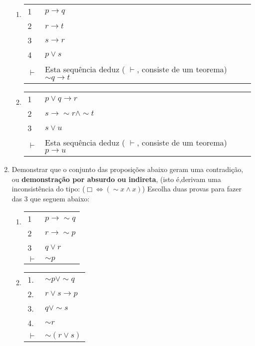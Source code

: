 \documentclass[12pt, a4paper,final]{article}
\begin{document}
\begin{enumerate}
\begin{enumerate}
\setlength{\itemsep}{-4pt} 
\item
 \vskip 11pt
 \begin{tabular}{ll}  %
 1 &  $  p  \rightarrow q $ \\    
 2 & $  r  \rightarrow t $  \\   
  3 & $  s  \rightarrow r $ \\   
  4 &  $ p \vee  s $ \\ \hline
      $\vdash $ & Esta sequ\^encia deduz ( $\vdash $, consiste de um teorema) $ \sim q \rightarrow t$
   
\end{tabular}
\item 
\vskip 11pt
 \begin{tabular}{ll}  %
 1 &  $  p \vee q  \rightarrow r $ \\    
  2 & $  s  \rightarrow \sim r \wedge \sim t $ \\   
  3 &  $ s \vee  u $ \\ \hline
      $\vdash $ & Esta sequ\^encia deduz ( $\vdash $, consiste de um teorema) $ p \rightarrow u$
\end{tabular}

\end{enumerate}



\item Demonstrar que o conjunto das proposi\c c\~oes abaixo geram uma contradi\c c\~ao, ou  {\bf demonstra\c c\~ao por absurdo ou indireta},  (isto \'e,derivam uma inconsist\^encia do tipo: ($\Box \Leftrightarrow (\sim x \wedge x)$)
Escolha duas provas para fazer das 3 que seguem  abaixo:

\begin{enumerate}
\setlength{\itemsep}{-4pt}
\item 
\vskip 11pt
\begin{tabular}{ll}  
  1 &  $ p \rightarrow \sim q $ \\  
  2 &  $ r \rightarrow \sim p $ \\ 
  3 &  $q \vee r$ \\ \hline
  $\vdash $  & $\sim p$   
\end{tabular}

\item 
\vskip 11pt
\begin{tabular}{ll}  %
   1. &  $  \sim p \vee \sim q $ \\   
    2. &   $ r \vee s \rightarrow p$  \\
    3. & $ q \vee \sim s $ \\    
    4. & $ \sim r $ \\ \hline
    $\vdash $  & $ \sim (r \vee s)$ 
\end{tabular}


\end{enumerate}
\end{enumerate}
\end{document}
